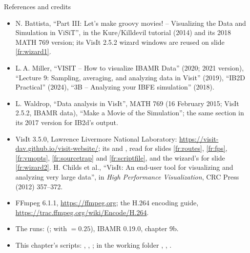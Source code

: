 \documentclass[aspectratio=169,11pt]{beamer}
\begin{document}
\begin{frame}{References and credits}
\label{fr:refs}
\scriptsize
\begin{itemize}
  \item N. Battista, ``Part III: Let's make groovy movies! -- Visualizing the Data and Simulation in ViSiT'', in the Kure/Killdevil tutorial (2014) and its 2018 MATH 769 version; its VisIt 2.5.2 wizard windows are reused on slide \ref{fr:wizard1}.
  \item L.\,A. Miller, ``VISIT -- How to visualize IBAMR Data'' (2020; 2021 version), ``Lecture 9: Sampling, averaging, and analyzing data in Visit'' (2019), ``IB2D Practical'' (2024), ``3B -- Analyzing your IBFE simulation'' (2018).
  \item L. Waldrop, ``Data analysis in VisIt'', MATH 769 (16 February 2015; VisIt 2.5.2, IBAMR data), ``Make a Movie of the Simulation''; the same section in its 2017 version for IB2d's  output.
  \item VisIt 3.5.0, Lawrence Livermore National Laboratory: \url{https://visit-dav.github.io/visit-website/}; its  and , read for slides \ref{fr:routes}, \ref{fr:fps}, \ref{fr:vmopts}, \ref{fr:sourcetrap} and \ref{fr:scriptfile}, and the wizard's  for slide \ref{fr:wizard2}. H. Childs et al., ``VisIt: An end-user tool for visualizing and analyzing very large data'', in \emph{High Performance Visualization}, CRC Press (2012) 357--372.
  \item FFmpeg 6.1.1, \url{https://ffmpeg.org}; the H.264 encoding guide, \url{https://trac.ffmpeg.org/wiki/Encode/H.264}.
  \item The runs:  (;  with  $= 0.25$), IBAMR 0.19.0, chapter 9b.
  \item This chapter's scripts: , , ; in the working folder , , .
\end{itemize}
\end{frame}
\end{document}

